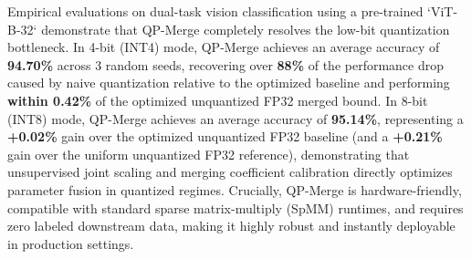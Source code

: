 Empirical evaluations on dual-task vision classification using a pre-trained `ViT-B-32` demonstrate that QP-Merge completely resolves the low-bit quantization bottleneck. In 4-bit (INT4) mode, QP-Merge achieves an average accuracy of \textbf{94.70\%} across 3 random seeds, recovering over \textbf{88\%} of the performance drop caused by naive quantization relative to the optimized baseline and performing \textbf{within 0.42\%} of the optimized unquantized FP32 merged bound. In 8-bit (INT8) mode, QP-Merge achieves an average accuracy of \textbf{95.14\%}, representing a \textbf{+0.02\%} gain over the optimized unquantized FP32 baseline (and a \textbf{+0.21\%} gain over the uniform unquantized FP32 reference), demonstrating that unsupervised joint scaling and merging coefficient calibration directly optimizes parameter fusion in quantized regimes. Crucially, QP-Merge is hardware-friendly, compatible with standard sparse matrix-multiply (SpMM) runtimes, and requires zero labeled downstream data, making it highly robust and instantly deployable in production settings.
